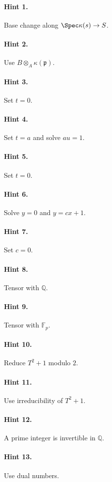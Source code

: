 \paragraph{Hint 1.} Base change along $\Spec\kappa(s)\to S$.
\paragraph{Hint 2.} Use $B\otimes_A\kappa(\mathfrak p)$.
\paragraph{Hint 3.} Set $t=0$.
\paragraph{Hint 4.} Set $t=a$ and solve $au=1$.
\paragraph{Hint 5.} Set $t=0$.
\paragraph{Hint 6.} Solve $y=0$ and $y=cx+1$.
\paragraph{Hint 7.} Set $c=0$.
\paragraph{Hint 8.} Tensor with $\mathbb Q$.
\paragraph{Hint 9.} Tensor with $\mathbb F_p$.
\paragraph{Hint 10.} Reduce $T^2+1$ modulo $2$.
\paragraph{Hint 11.} Use irreducibility of $T^2+1$.
\paragraph{Hint 12.} A prime integer is invertible in $\mathbb Q$.
\paragraph{Hint 13.} Use dual numbers.
